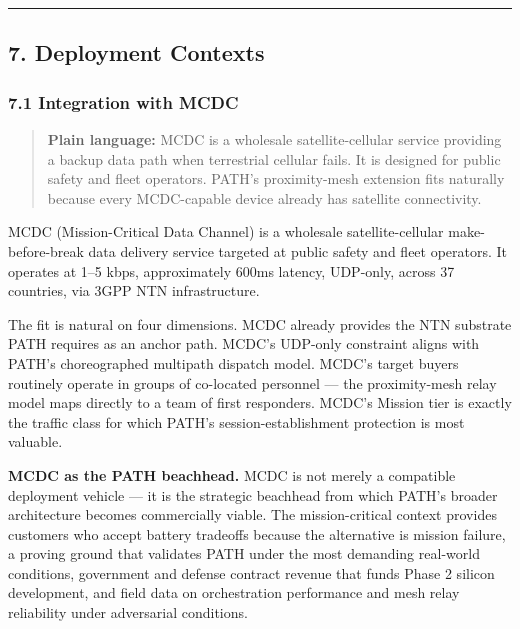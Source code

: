 \documentclass[
  11pt,
]{article}
\begin{document}
\begin{center}\rule{0.5\linewidth}{0.5pt}\end{center}

\hypertarget{deployment-contexts}{%
\subsection{7. Deployment Contexts}\label{deployment-contexts}}

\hypertarget{integration-with-mcdc}{%
\subsubsection{7.1 Integration with MCDC}\label{integration-with-mcdc}}

\begin{quote}
\textbf{Plain language:} MCDC is a wholesale satellite-cellular service
providing a backup data path when terrestrial cellular fails. It is
designed for public safety and fleet operators. PATH's proximity-mesh
extension fits naturally because every MCDC-capable device already has
satellite connectivity.
\end{quote}

MCDC (Mission-Critical Data Channel) is a wholesale satellite-cellular
make-before-break data delivery service targeted at public safety and
fleet operators. It operates at 1--5 kbps, approximately 600ms latency,
UDP-only, across 37 countries, via 3GPP NTN infrastructure.

The fit is natural on four dimensions. MCDC already provides the NTN
substrate PATH requires as an anchor path. MCDC's UDP-only constraint
aligns with PATH's choreographed multipath dispatch model. MCDC's target
buyers routinely operate in groups of co-located personnel --- the
proximity-mesh relay model maps directly to a team of first responders.
MCDC's Mission tier is exactly the traffic class for which PATH's
session-establishment protection is most valuable.

\textbf{MCDC as the PATH beachhead.} MCDC is not merely a compatible
deployment vehicle --- it is the strategic beachhead from which PATH's
broader architecture becomes commercially viable. The mission-critical
context provides customers who accept battery tradeoffs because the
alternative is mission failure, a proving ground that validates PATH
under the most demanding real-world conditions, government and defense
contract revenue that funds Phase 2 silicon development, and field data
on orchestration performance and mesh relay reliability under
adversarial conditions.
\end{document}
